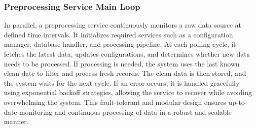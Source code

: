 \subsubsection{Preprocessing Service Main Loop}

In parallel, a preprocessing service continuously monitors a raw data source at defined time intervals. It initializes required services such as a configuration manager, database handler, and processing pipeline. At each polling cycle, it fetches the latest data, updates configurations, and determines whether new data needs to be processed. If processing is needed, the system uses the last known clean date to filter and process fresh records. The clean data is then stored, and the system waits for the next cycle. If an error occurs, it is handled gracefully using exponential backoff strategies, allowing the service to recover while avoiding overwhelming the system. This fault-tolerant and modular design ensures up-to-date monitoring and continuous processing of data in a robust and scalable manner.

